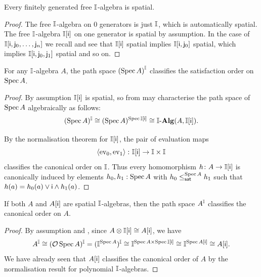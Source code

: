 \begin{lemma}[\AxiomSQCP]\label{lem:fg-qc}
  Every finitely generated free $\mathbb{I}$-algebra is spatial.
\end{lemma}

\begin{proof}
  The free $\mathbb{I}$-algebra on $0$ generators is just $\mathbb{I}$, which is automatically spatial. The free $\mathbb{I}$-algebra $\mathbb{I}[\mathsf{i}]$ on one generator is spatial by assumption. In the case of $\mathbb{I}[\mathsf{i},\mathsf{j}_0,\ldots,\mathsf{j}_n]$ we recall  and see that $\mathbb{I}[\mathsf{i}]$ spatial implies $\mathbb{I}[\mathsf{i},\mathsf{j}_0]$ spatial, which implies $\mathbb{I}[\mathsf{i},\mathsf{j}_0,\mathsf{j}_1]$ spatial and so on.
\end{proof}


\begin{theorem}[\AxiomSQCP]\label{thm:phoa-spectrum}
  For any $\mathbb{I}$-algebra $A$, the path space ${(\operatorname{Spec} A)}^{\mathbb{I}}$ classifies the satisfaction order on $\operatorname{Spec} A$.
\end{theorem}
\begin{proof}
  By assumption $\mathbb{I}[\mathsf{i}]$ is spatial, so from  may characterise the path space of $\operatorname{Spec}{A}$ algebraically as follows:
  \[ (\spec A)^\I \cong (\spec{A})^{\spec{\I[\ms{i}]}}\cong \I\alg(A,\I[\ms{i}])\text{.} \]
  
  By the normalisation theorem for $\mathbb{I}[\mathsf{i}]$, the pair of evaluation maps
  \[ \left\langle\mathrm{ev}_0,\mathrm{ev}_1\right\rangle \colon \mathbb{I}[\mathsf{i}] \to \mathbb{I} \times \mathbb{I} \]
  classifies the canonical order on $\mathbb{I}$.
  Thus every homomorphism $h\colon A\to \mathbb{I}[\mathsf{i}]$ is canonically induced by elements $h_0,h_1:\operatorname{Spec}{A}$ with $h_0\satle[\spec{A}] h_1$ such that $h(a) = h_0(a) \vee \mathsf{i} \wedge h_1(a)$.
\end{proof}


\begin{theorem}[\AxiomSQCP]\label{thm:algebraphoa}
  If both $A$ and $A[\mathsf{i}]$ are spatial $\mathbb{I}$-algebras, then the path space $A^{\mathbb{I}}$ classifies the canonical order on $A$.
\end{theorem}
\begin{proof}
  By assumption and , since $A \otimes \mathbb{I}[\mathsf{i}] \cong A[\mathsf{i}]$, we have
  \[ A^\I \cong (\opens\spec A)^\I = (\I^{\spec A})^\I \cong \I^{\spec A \times \spec\I[\ms{i}]} \cong \I^{\spec A[\ms{i}]} \cong A[\ms{i}]\text{.} \]
  We have already seen that $A[\mathsf{i}]$ classifies the canonical order of $A$ by the normalisation result for polynomial $\mathbb{I}$-algebras.
\end{proof}

